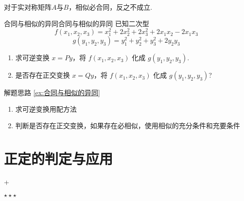 对于实对称矩阵$A$与$B$，相似必合同，反之不成立.
\begin{example}{合同与相似的异同}{合同与相似的异同}
    已知二次型
    $$f(x_{1}, x_{2}, x_{3}) = x_{1}^{2} + 2x_{2}^{2} + 2x_{3}^{2} + 2x_{1}x_{2} - 2x_{1}x_{3}$$
    $$
        g(y_{1}, y_{2}, y_{3}) = y_{1}^{2} + y_{2}^{2} + y_{3}^{2} + 2y_{2}y_{3}$$
    \begin{enumerate}
        \item 求可逆变换 $x = Py$，将 $f(x_{1}, x_{2}, x_{3})$ 化成 $g(y_{1}, y_{2}, y_{3})$.
        \item 是否存在正交变换 $x = Qy$，将 $f(x_{1}, x_{2}, x_{3})$ 化成 $g(y_{1}, y_{2}, y_{3})$?
    \end{enumerate}
\end{example}
\begin{idea}{解题思路 \ref{ex:合同与相似的异同}}{}
    \begin{enumerate}
        \item 求可逆变换用配方法
        \item 判断是否存在正交变换，如果存在必相似，使用相似的充分条件和充要条件
    \end{enumerate}
\end{idea}
\section{正定的判定与应用}
\DOne+\DTwoThree

$\star\star\star$

